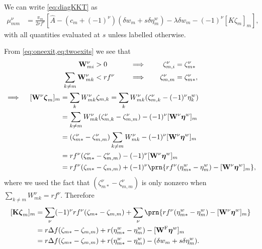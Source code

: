 \documentclass[12pt]{article}
\newcommand{\eqm}{\pi}
\newcommand{\etwm}{\eta^w}
\newcommand{\etw}{\boldsymbol{\eta}^w}
\newcommand{\dgnm}{\zeta}
\newcommand{\dgn}{\boldsymbol{\dgnm}}
\newcommand{\wm}{w}
\newcommand{\Wm}{W}
\newcommand{\W}{\mathbf{\Wm}}
\newcommand{\encm}{K}
\newcommand{\enc}{\mathbf{\encm}}
\newcommand{\frg}{\W^{\mathrm{F}}}
\begin{document}
We can write \cref{eq:diagKKT} as
%
\begin{equation*}
\begin{aligned}
  \mu^\nu_{mm} &= \frac{\eqm_m}{2rf^\nu} 
    \left[ 
      \hat{A}
      - (c_m + (-1)^\nu) (\delta \wm_m + s \delta \etwm_m)
      - \lambda \delta w_m
      - (-1)^\nu [\encm \dgnm_m]_m
    \right],
\end{aligned}
\end{equation*}
%
with all quantities evaluated at \(s\) unless labelled otherwise.

From \cref{eq:oneexit,eq:twoexits} we see that
%
\begin{equation*}
\begin{gathered}
  \begin{aligned}
    \W^\nu_{mi} &> 0 &
    \quad &\implies \quad &
    \dgnm^\nu_{m,i} &= \dgnm^\nu_{m*}
    \\
    \sum_{k \neq m} \W^\nu_{mk} &< r f^\nu &
    &\implies &
    \dgnm^\nu_{m,m} &= \dgnm^\nu_{m*},
  \end{aligned}
  \\
  \begin{aligned}
    \implies \quad
    [\W^\nu \dgn_m]_m
      &= \sum_k \Wm^\nu_{mk}  \dgnm_{m,k}
      = \sum_k \Wm^\nu_{mk}
        (\dgnm^\nu_{m,k} - (-1)^\nu \etwm_k) \\
      &= \sum_{k \neq m} \Wm^\nu_{mk} 
        (\dgnm^\nu_{m,k} - \dgnm^\nu_{m,m}) 
        - (-1)^\nu [\W^\nu \etw]_m \\
      &= (\dgnm^\nu_{m*} - \dgnm^\nu_{m,m}) 
        \sum_{k \neq m} \Wm^\nu_{mk}
        - (-1)^\nu [\W^\nu \etw]_m \\
      &= r f^\nu (\dgnm^\nu_{m*} - \dgnm^\nu_{m,m}) 
        - (-1)^\nu [\W^\nu \etw]_m \\
      &= r f^\nu (\dgnm_{m*} - \dgnm_{m,m}) 
        + (-1)^\nu \prn{
          r f^\nu (\etwm_{m*} - \etwm_m)
          - [\W^\nu \etw]_m
        },
  \end{aligned}
\end{gathered}
\end{equation*}
%
where we used the fact that \( (\dgnm^\nu_{m*} - \dgnm^\nu_{m,m}) \) is only nonzero when \( \sum_{k \neq m} \Wm^\nu_{mk} = rf^\nu \).
Therefore
%
\begin{equation*}
\begin{aligned}
  [\enc \dgn_m]_m
    &= \sum_{\nu} (-1)^\nu rf^\nu 
      (\dgnm_{m*} - \dgnm_{m,m}) 
      + \sum_{\nu} \prn{
        r f^\nu (\etwm_{m*} - \etwm_m)
        -  [\W^\nu \etw]_m
      } \\
    &= r\Delta f (\dgnm_{m*} - \dgnm_{m,m}) 
      + r(\etwm_{m*} - \etwm_m)
      - [\frg \etw]_m \\
    &= r\Delta f (\dgnm_{m*} - \dgnm_{m,m}) 
      + r(\etwm_{m*} - \etwm_m)
      - (\delta w_m + s \delta \etwm_m).
\end{aligned}
\end{equation*}
\end{document}
